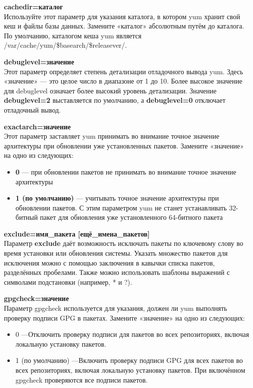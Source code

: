 \documentclass[a4paper,10pt,twoside]{article}
\begin{document}
\textbf{cachedir=каталог}\\
Используйте этот параметр для указания каталога, в котором yum хранит свой кеш и файлы базы данных. Замените «каталог» абсолютным путём до каталога. По умолчанию, каталогом кеша yum является /var/cache/yum/\$basearch/\$releasever/.

\textbf{debuglevel=значение}\\
Этот параметр определяет степень детализации отладочного вывода yum. Здесь «значение» — это целое число в диапазоне от 1 до 10. Более высокое значение для debuglevel означает более высокий уровень детализации. Значение \textbf{debuglevel=2} выставляется по умолчанию, а \textbf{debuglevel=0} отключает отладочный вывод.

\textbf{exactarch=значение}\\
Этот параметр заставляет yum принимать во внимание точное значение архитектуры при обновлении уже установленных пакетов. Замените «значение» на одно из следующих:
\begin{itemize}
\item \textbf{0} — при обновлении пакетов не принимать во внимание точное значение архитектуры\\
\item \textbf{1 (по умолчанию)} — учитывать точное значение архитектуры при обновлении пакетов. С этим параметром yum не станет устанавливать 32-битный пакет для обновления уже установленного 64-битного пакета
\end{itemize}

\textbf{exclude=имя\_пакета [ещё\_имена\_пакетов]}\\
Параметр \textbf{exclude} даёт возможность исключать пакеты по ключевому слову во время установки или обновления системы. Указать множество пакетов для исключения можно с помощью заключения в кавычки списка пакетов, разделённых пробелами. Также можно использовать шаблоны выражений с символами подстановки (например, * и ?).

\textbf{gpgcheck=значение}\\
Параметр gpgcheck используется для указания, должен ли yum выполнять проверку подписи GPG в пакетах. Замените «значение» на одно из следующих:
\begin{itemize}
\item 0 —Отключить проверку подписи для пакетов во всех репозиториях, включая локальную установку пакетов.
\item 1 (по умолчанию) —Включить проверку подписи GPG для всех пакетов во всех репозиториях, включая локальную установку пакетов. При включённом gpgcheck проверяются все подписи пакетов.
\end{itemize}
\end{document}
